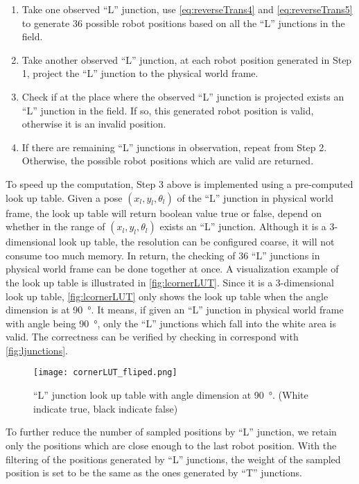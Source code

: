 \begin{enumerate}
  \item Take one observed ``L'' junction, use \autoref{eq:reverseTrans4} and \autoref{eq:reverseTrans5} to generate 36 possible robot positions based on all the ``L'' junctions in the field. 
  \item Take another observed ``L'' junction, at each robot position generated in Step 1, project the ``L'' junction to the physical world frame.
  \item Check if at the place where the observed ``L'' junction  is projected exists an  ``L'' junction in the field. If so, this generated robot position is valid, otherwise it is an invalid position.
  \item If there are  remaining ``L'' junctions in observation, repeat from Step 2. Otherwise, the possible robot positions which are valid are returned.
\end{enumerate}

To speed up the computation, Step 3 above is implemented using a pre-computed look up table. Given a pose $(x_l, y_l, \theta_l)$ of the ``L'' junction in physical world frame,  the look up table will return boolean value true or false, depend on whether in the range of $(x_l, y_l, \theta_l)$ exists an ``L'' junction. Although it is a 3-dimensional look up table, the resolution can be configured coarse, it will not consume too much memory. In return, the checking of 36 ``L'' junctions in physical world frame can be done together at once. A visualization example of the look up table is illustrated in \autoref{fig:lcornerLUT}. Since it is a 3-dimensional look up table, \autoref{fig:lcornerLUT} only shows the look up table when the angle dimension is at \SI{90}{\degree}. It means, if given an ``L'' junction in physical world frame with angle being \SI{90}{\degree}, only the ``L'' junctions which fall into the white area is valid. The correctness can be verified by checking in correspond with \autoref{fig:ljunctions}.

\begin{figure}
\begin{center}
	\texttt{[image: cornerLUT\_fliped.png]}
\end{center}
\caption[``L'' junction look up table]{``L'' junction look up table with angle dimension at \SI{90}{\degree}. (White indicate true, black indicate false)}
\label{fig:lcornerLUT}
\end{figure}

To further reduce the number of sampled positions by ``L'' junction, we retain only the positions which are close enough to the last robot position. With the filtering of the positions generated by ``L'' junctions, the weight of the sampled position is set to be the same as the ones generated by ``T'' junctions.

